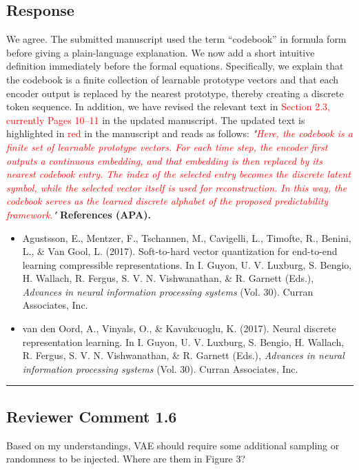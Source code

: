 \documentclass{NSF}
\begin{document}
\subsection{Response}
We agree. The submitted manuscript used the term ``codebook'' in formula form before giving a plain-language explanation. We now add a short intuitive definition immediately before the formal equations. Specifically, we explain that the codebook is a finite collection of learnable prototype vectors and that each encoder output is replaced by the nearest prototype, thereby creating a discrete token sequence.
\noindent In addition, we have revised the relevant text in \textcolor{red}{Section 2.3, currently Pages 10--11} in the updated manuscript. The updated text is highlighted in \textcolor{red}{red} in the manuscript and reads as follows:
\vskip 0.1cm
\noindent \textit{"\textcolor{red}{Here, the \emph{codebook} is a finite set of learnable prototype vectors. For each time step, the encoder first outputs a continuous embedding, and that embedding is then replaced by its nearest codebook entry. The index of the selected entry becomes the discrete latent symbol, while the selected vector itself is used for reconstruction. In this way, the codebook serves as the learned discrete alphabet of the proposed predictability framework.}"}
\vskip 0.05in
\noindent\textbf{References (APA).}
\begin{itemize}
    \item Agustsson, E., Mentzer, F., Tschannen, M., Cavigelli, L., Timofte, R., Benini, L., \& Van Gool, L. (2017). Soft-to-hard vector quantization for end-to-end learning compressible representations. In I. Guyon, U. V. Luxburg, S. Bengio, H. Wallach, R. Fergus, S. V. N. Vishwanathan, \& R. Garnett (Eds.), \textit{Advances in neural information processing systems} (Vol. 30). Curran Associates, Inc.
    \item van den Oord, A., Vinyals, O., \& Kavukcuoglu, K. (2017). Neural discrete representation learning. In I. Guyon, U. V. Luxburg, S. Bengio, H. Wallach, R. Fergus, S. V. N. Vishwanathan, \& R. Garnett (Eds.), \textit{Advances in neural information processing systems} (Vol. 30). Curran Associates, Inc.
\end{itemize}

\noindent\rule{16.5cm}{1.0pt}

\subsection{Reviewer Comment 1.6}
\begin{mdframed}
Based on my understandings, VAE should require some additional sampling or randomness to be injected. Where are them in Figure 3?
\end{mdframed}
\end{document}
